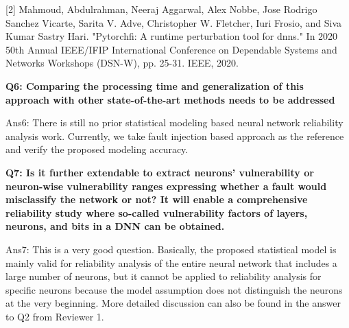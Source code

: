 [2] Mahmoud, Abdulrahman, Neeraj Aggarwal, Alex Nobbe, Jose Rodrigo Sanchez Vicarte, Sarita V. Adve, Christopher W. Fletcher, Iuri Frosio, and Siva Kumar Sastry Hari. "Pytorchfi: A runtime perturbation tool for dnns." In 2020 50th Annual IEEE/IFIP International Conference on Dependable Systems and Networks Workshops (DSN-W), pp. 25-31. IEEE, 2020.

\textbf{Q6: Comparing the processing time and generalization of this approach with other state-of-the-art methods needs to be addressed}

Ans6: There is still no prior statistical modeling based neural network reliability analysis work. Currently, we take fault injection based approach as the reference and verify the proposed modeling accuracy.

\textbf{Q7: Is it further extendable to extract neurons’ vulnerability or neuron-wise vulnerability ranges expressing whether a fault would misclassify the network or not? It will enable a comprehensive reliability study where so-called vulnerability factors of layers, neurons, and bits in a DNN can be obtained.}

Ans7: This is a very good question. Basically, the proposed statistical model is mainly valid for reliability analysis of the entire neural network that includes a large number of neurons, but it cannot be applied to reliability analysis for specific neurons because the model assumption does not distinguish the neurons at the very beginning. More detailed discussion can also be found in the answer to Q2 from Reviewer 1. 